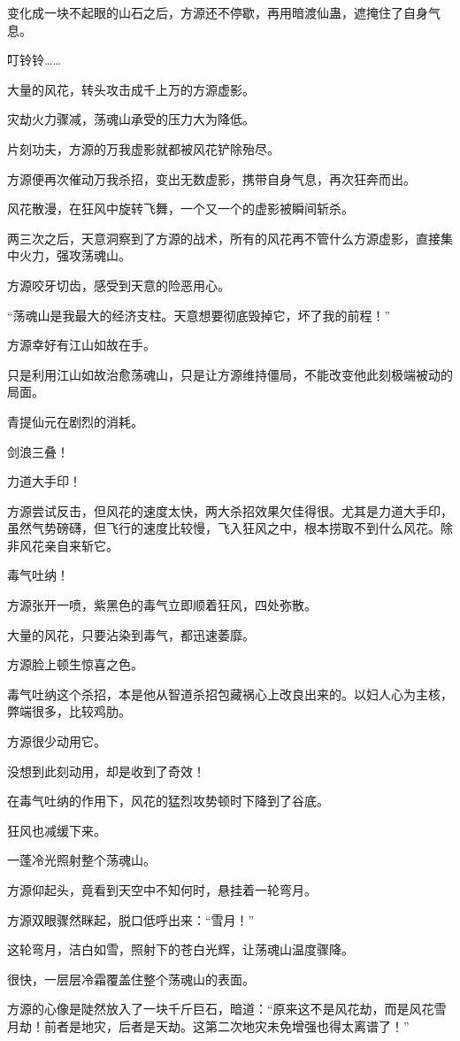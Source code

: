 \begin{this_body}
变化成一块不起眼的山石之后，方源还不停歇，再用暗渡仙蛊，遮掩住了自身气息。

叮铃铃……

大量的风花，转头攻击成千上万的方源虚影。

灾劫火力骤减，荡魂山承受的压力大为降低。

片刻功夫，方源的万我虚影就都被风花铲除殆尽。

方源便再次催动万我杀招，变出无数虚影，携带自身气息，再次狂奔而出。

风花散漫，在狂风中旋转飞舞，一个又一个的虚影被瞬间斩杀。

两三次之后，天意洞察到了方源的战术，所有的风花再不管什么方源虚影，直接集中火力，强攻荡魂山。

方源咬牙切齿，感受到天意的险恶用心。

“荡魂山是我最大的经济支柱。天意想要彻底毁掉它，坏了我的前程！”

方源幸好有江山如故在手。

只是利用江山如故治愈荡魂山，只是让方源维持僵局，不能改变他此刻极端被动的局面。

青提仙元在剧烈的消耗。

剑浪三叠！

力道大手印！

方源尝试反击，但风花的速度太快，两大杀招效果欠佳得很。尤其是力道大手印，虽然气势磅礴，但飞行的速度比较慢，飞入狂风之中，根本捞取不到什么风花。除非风花亲自来斩它。

毒气吐纳！

方源张开一喷，紫黑色的毒气立即顺着狂风，四处弥散。

大量的风花，只要沾染到毒气，都迅速萎靡。

方源脸上顿生惊喜之色。

毒气吐纳这个杀招，本是他从智道杀招包藏祸心上改良出来的。以妇人心为主核，弊端很多，比较鸡肋。

方源很少动用它。

没想到此刻动用，却是收到了奇效！

在毒气吐纳的作用下，风花的猛烈攻势顿时下降到了谷底。

狂风也减缓下来。

一蓬冷光照射整个荡魂山。

方源仰起头，竟看到天空中不知何时，悬挂着一轮弯月。

方源双眼骤然眯起，脱口低呼出来：“雪月！”

这轮弯月，洁白如雪，照射下的苍白光辉，让荡魂山温度骤降。

很快，一层层冷霜覆盖住整个荡魂山的表面。

方源的心像是陡然放入了一块千斤巨石，暗道：“原来这不是风花劫，而是风花雪月劫！前者是地灾，后者是天劫。这第二次地灾未免增强也得太离谱了！”

\end{this_body}


